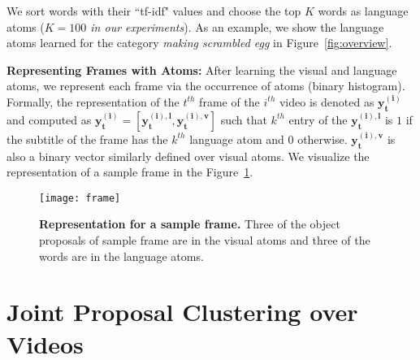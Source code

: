 We sort words with their ``tf-idf" values and choose the top $K$ words as language atoms (\emph{$K=100$ in our experiments}). As an example, we show the language atoms learned for the category \emph{making scrambled egg} in Figure~\ref{fig:overview}. %


\noindent\textbf{Representing Frames with Atoms:}
After learning the visual and language atoms, we represent each frame via the occurrence of atoms (binary histogram). Formally, the representation of the $t^{th}$ frame of the $i^{th}$ video is denoted as $\mathbf{y^{(i)}_t}$ and computed as $\mathbf{y^{(i)}_t}=[\mathbf{y^{(i),l}_t},\mathbf{y^{(i),v}_t}]$ such that $k^{th}$ entry of the $\mathbf{y^{(i),l}_t}$ is $1$ if the subtitle of the frame has the $k^{th}$ language atom and $0$ otherwise. $\mathbf{y^{(i),v}_t}$ is also a binary vector similarly defined over visual atoms. We visualize the representation of a sample frame in the Figure~\ref{visFrame}.
\begin{figure}[h!]
  \texttt{[image: frame]}
  \caption{\textbf{Representation for a sample frame.} Three of the object proposals of sample frame are in the visual atoms and three of the words are in the language atoms.}
  \label{visFrame}
  \vspace{-4mm}
\end{figure}

\vspace{-1mm}
\section{Joint Proposal Clustering over Videos}
\label{jointProp}
\vspace{-1mm}


